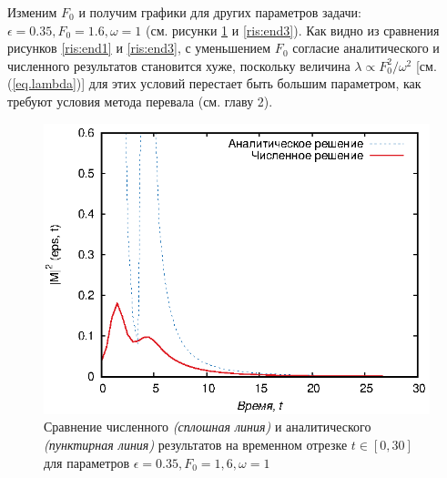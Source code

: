 \documentclass[14pt, a4paper]{article}
\numberwithin{figure}{section}
\numberwithin{equation}{section}
\begin{document}
Изменим $F_0$ и получим графики для других параметров задачи: $\epsilon = 0.35, F_0 = 1.6, \omega = 1$ (см. рисунки \ref{ris:full3} и \ref{ris:end3}). Как видно из сравнения рисунков \ref{ris:end1} и \ref{ris:end3}, с уменьшением $F_0$ согласие аналитического и численного результатов становится хуже, поскольку величина $\lambda\propto F_0^2/\omega^2$ [см. (\ref{eq.lambda})] для этих условий перестает быть большим параметром, как требуют условия метода перевала (см. главу 2). 

\begin{figure}[h]
	\begin{center}
		\includegraphics[width=1\linewidth]{full3}
		\caption{Сравнение численного \textit{(сплошная линия)} и аналитического \textit{(пунктирная линия)} результатов на временном отрезке $t\in[0, 30]$ для параметров $\epsilon = 0.35, F_0 = 1,6, \omega = 1$} %
		\label{ris:full3} %
	\end{center}
\end{figure}
\end{document}
